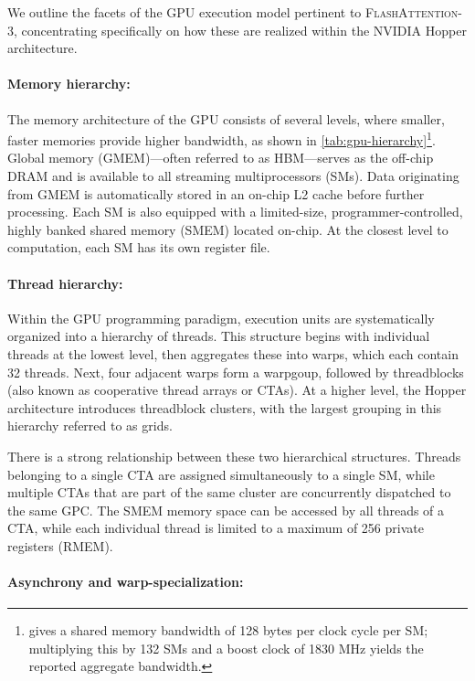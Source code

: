 We outline the facets of the GPU execution model pertinent to \textsc{FlashAttention-3}, concentrating specifically on how these are realized within the NVIDIA Hopper architecture.

\paragraph{Memory hierarchy:} The memory architecture of the GPU consists of several levels, where smaller, faster memories provide higher bandwidth, as shown in \cref{tab:gpu-hierarchy}\footnote{\citet{luo2024benchmarking} gives a shared memory bandwidth of 128 bytes per clock cycle per SM; multiplying this by 132 SMs and a boost clock of 1830 MHz yields the reported aggregate bandwidth.}. Global memory (GMEM)—often referred to as HBM—serves as the off-chip DRAM and is available to all streaming multiprocessors (SMs). Data originating from GMEM is automatically stored in an on-chip L2 cache before further processing. Each SM is also equipped with a limited-size, programmer-controlled, highly banked shared memory (SMEM) located on-chip. At the closest level to computation, each SM has its own register file.

\paragraph{Thread hierarchy:} Within the GPU programming paradigm, execution units are systematically organized into a hierarchy of threads. This structure begins with individual threads at the lowest level, then aggregates these into warps, which each contain 32 threads. Next, four adjacent warps form a warpgoup, followed by threadblocks (also known as cooperative thread arrays or CTAs). At a higher level, the Hopper architecture introduces threadblock clusters, with the largest grouping in this hierarchy referred to as grids.

There is a strong relationship between these two hierarchical structures. Threads belonging to a single CTA are assigned simultaneously to a single SM, while multiple CTAs that are part of the same cluster are concurrently dispatched to the same GPC. The SMEM memory space can be accessed by all threads of a CTA, while each individual thread is limited to a maximum of 256 private registers (RMEM).

\paragraph{Asynchrony and warp-specialization:}

